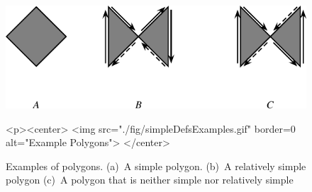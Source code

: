 \begin{figure}[!htp]
\begin{center}
\begin{ccTexOnly}
  \begin{center}
  \includegraphics{Boolean_set_operations_2/fig/simpleDefsExamples}
  \end{center}
\end{ccTexOnly}
\label{fig:simpleDefsExamples}
\begin{ccHtmlOnly}
  <p><center>
    <img src="./fig/simpleDefsExamples.gif" border=0 alt="Example Polygons">
  </center>
\end{ccHtmlOnly}
\caption{Examples of polygons. (a)~A simple polygon. (b)~A relatively simple polygon (c)~A polygon that is neither simple nor relatively simple} 
\end{center}
\end{figure}

